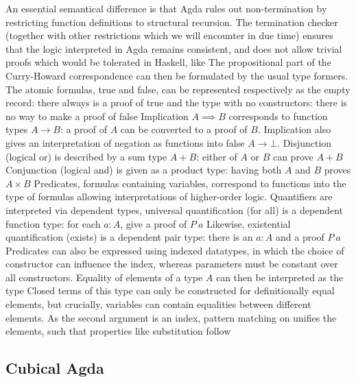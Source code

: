 An essential semantical difference is that Agda rules out non-termination by restricting function definitions to structural recursion. The termination checker (together with other restrictions which we will encounter in due time) ensures that the logic interpreted in Agda remains consistent, and does not allow trivial proofs which would be tolerated in Haskell, like
The propositional part of the Curry-Howard correspondence can then be formulated by the usual type formers. The atomic formulas, true and false, can be represented respectively as the empty record: there always is a proof  of true
and the type with no constructors: there is no way to make a proof of false
Implication $A \implies B$ corresponds to function types $A \to B$: a proof of $A$ can be converted to a proof of $B$. Implication also gives an interpretation of negation as functions into false $A \to \bot$. Disjunction (logical or) is described by a sum type $A + B$: either of $A$ or $B$ can prove $A + B$
Conjunction (logical and) is given as a product type: having both $A$ and $B$ proves $A \times B$
Predicates, formulas containing variables, correspond to functions into the type of formulas
allowing interpretations of higher-order logic. Quantifiers are interpreted via dependent types, universal quantification (for all) is a dependent function type: for each $a : A$, give a proof of $P\ a$
Likewise, existential quantification (exists) is a dependent pair type: there is an $a : A$ and a proof $P\ a$
Predicates can also be expressed using indexed datatypes, in which the choice of constructor can influence the index, whereas parameters must be constant over all constructors. Equality of elements of a type $A$ can then be interpreted as the type
Closed terms of this type can only be constructed for definitionally equal elements, but crucially, variables can contain equalities between different elements. As the second argument is an index, pattern matching on  unifies the elements, such that properties like substitution follow

\subsection{Cubical Agda}

